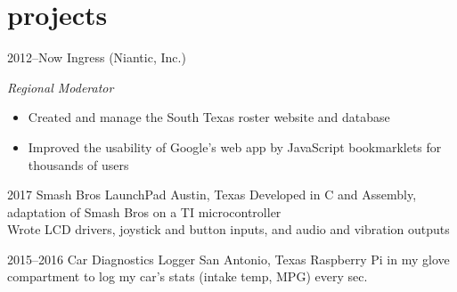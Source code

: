 \documentclass[]{friggeri-cv} %
\begin{document}
\vspace{-11pt}
\section{projects}
\vspace{-7pt}

\begin{entrylist}

	\entry
	{2012--Now}
	{Ingress (Niantic, Inc.)}
	{}
	{\emph{Regional Moderator}
		\begin{itemize}
			\item Created and manage the South Texas roster website and database
			\item Improved the usability of Google's web app by JavaScript bookmarklets for thousands of users
		\end{itemize}
	}


	\entry
	{2017}
	{Smash Bros LaunchPad}
	{Austin, Texas}
	{
		Developed in C and Assembly, adaptation of Smash Bros on a TI microcontroller \\
		Wrote LCD drivers, joystick and button inputs, and audio and vibration outputs
	}


	\entry
	{2015--2016}
	{Car Diagnostics Logger}
	{San Antonio, Texas}
	{Raspberry Pi in my glove compartment to log my car's stats (intake temp, MPG) every  sec.}

\end{entrylist}
\end{document}
